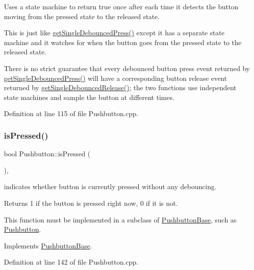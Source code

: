 Uses a state machine to return true once after each time it detects the button moving from the pressed state to the released state. 

This is just like \hyperlink{class_pushbutton_base_a93953875c8b1c5f69dec3984774de296}{get\+Single\+Debounced\+Press()} except it has a separate state machine and it watches for when the button goes from the pressed state to the released state.

There is no strict guarantee that every debounced button press event returned by \hyperlink{class_pushbutton_base_a93953875c8b1c5f69dec3984774de296}{get\+Single\+Debounced\+Press()} will have a corresponding button release event returned by \hyperlink{class_pushbutton_base_ae568f5db0e8804247e0dcab72a311d42}{get\+Single\+Debounced\+Release()}; the two functions use independent state machines and sample the button at different times. 

Definition at line 115 of file Pushbutton.\+cpp.

\mbox{\label{class_pushbutton_a4990786220489fb5b6cf3af19b601a24}} 
\subsubsection{\texorpdfstring{is\+Pressed()}{isPressed()}}
{\footnotesize\ttfamily bool Pushbutton\+::is\+Pressed (\begin{DoxyParamCaption}{ }\end{DoxyParamCaption})\hspace{0.3cm}{\ttfamily [virtual]}, {\ttfamily [inherited]}}



indicates whether button is currently pressed without any debouncing. 

\begin{DoxyReturn}{Returns}
1 if the button is pressed right now, 0 if it is not.
\end{DoxyReturn}
This function must be implemented in a subclass of \hyperlink{class_pushbutton_base}{Pushbutton\+Base}, such as \hyperlink{class_pushbutton}{Pushbutton}. 

Implements \hyperlink{class_pushbutton_base_a5b11851f15413140b75e4574e773b6ae}{Pushbutton\+Base}.



Definition at line 142 of file Pushbutton.\+cpp.

